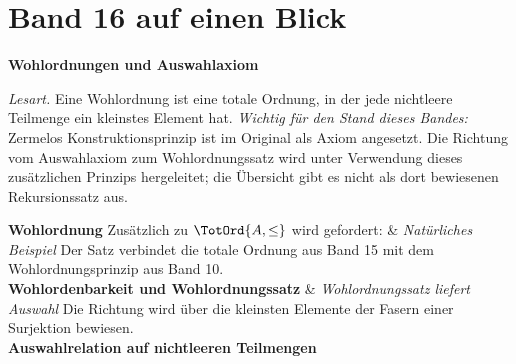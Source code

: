 \chapter[Band 16: Wohlordnungen und Auswahlaxiom]{Band 16 auf einen Blick}
\noindent\textbf{Wohlordnungen und Auswahlaxiom}\par\medskip
\noindent\emph{Lesart.} Eine Wohlordnung ist eine totale Ordnung,
in der jede nichtleere Teilmenge ein kleinstes Element hat.
\emph{Wichtig für den Stand dieses Bandes:} Zermelos Konstruktionsprinzip
ist im Original als Axiom angesetzt. Die Richtung vom Auswahlaxiom zum
Wohlordnungssatz wird unter Verwendung dieses zusätzlichen Prinzips
hergeleitet; die Übersicht gibt es nicht als dort bewiesenen Rekursionssatz aus.
\begin{BandUebersicht}
\textbf{Wohlordnung}
Zusätzlich zu \(\TotOrd{A,\leq}\) wird gefordert:
&
\textit{Natürliches Beispiel}
Der Satz verbindet die totale Ordnung aus Band 15 mit dem
Wohlordnungsprinzip aus Band 10.
\\
\addlinespace[.8ex]
\textbf{Wohlordenbarkeit und Wohlordnungssatz}
&
\textit{Wohlordnungssatz liefert Auswahl}
Die Richtung wird über die kleinsten Elemente der Fasern einer
Surjektion bewiesen.
\\
\addlinespace[.8ex]
\textbf{Auswahlrelation auf nichtleeren Teilmengen}
\end{BandUebersicht}
